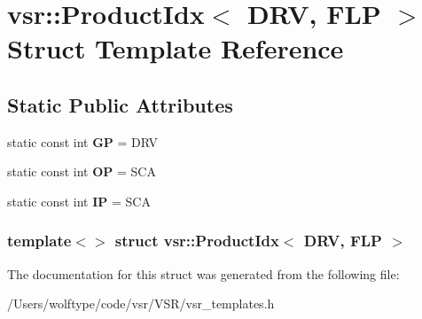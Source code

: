\hypertarget{structvsr_1_1_product_idx_3_01_d_r_v_00_01_f_l_p_01_4}{\section{vsr\-:\-:Product\-Idx$<$ D\-R\-V, F\-L\-P $>$ Struct Template Reference}
\label{structvsr_1_1_product_idx_3_01_d_r_v_00_01_f_l_p_01_4}
}
\subsection*{Static Public Attributes}
\begin{DoxyCompactItemize}
\item 
\hypertarget{structvsr_1_1_product_idx_3_01_d_r_v_00_01_f_l_p_01_4_abb1bbf99a96dd7ce52d7f1095ed224e9}{static const int {\bfseries G\-P} = D\-R\-V}\label{structvsr_1_1_product_idx_3_01_d_r_v_00_01_f_l_p_01_4_abb1bbf99a96dd7ce52d7f1095ed224e9}

\item 
\hypertarget{structvsr_1_1_product_idx_3_01_d_r_v_00_01_f_l_p_01_4_a4038db2e3b579baa7121670b9ebaf67a}{static const int {\bfseries O\-P} = S\-C\-A}\label{structvsr_1_1_product_idx_3_01_d_r_v_00_01_f_l_p_01_4_a4038db2e3b579baa7121670b9ebaf67a}

\item 
\hypertarget{structvsr_1_1_product_idx_3_01_d_r_v_00_01_f_l_p_01_4_a396f42e0a9ff8198df1e26eb2fd74393}{static const int {\bfseries I\-P} = S\-C\-A}\label{structvsr_1_1_product_idx_3_01_d_r_v_00_01_f_l_p_01_4_a396f42e0a9ff8198df1e26eb2fd74393}

\end{DoxyCompactItemize}
\subsubsection*{template$<$$>$ struct vsr\-::\-Product\-Idx$<$ D\-R\-V, F\-L\-P $>$}



The documentation for this struct was generated from the following file\-:\begin{DoxyCompactItemize}
\item 
/\-Users/wolftype/code/vsr/\-V\-S\-R/vsr\-\_\-templates.\-h\end{DoxyCompactItemize}
